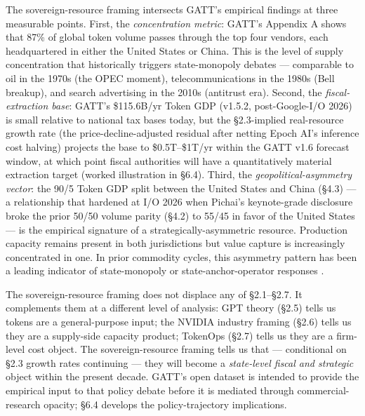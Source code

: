 \documentclass[11pt,a4paper]{article}
\begin{document}
The sovereign-resource framing intersects GATT's empirical findings at three measurable points. First, the \emph{concentration metric}: GATT's Appendix A shows that 87\% of global token volume passes through the top four vendors, each headquartered in either the United States or China. This is the level of supply concentration that historically triggers state-monopoly debates --- comparable to oil in the 1970s (the OPEC moment), telecommunications in the 1980s (Bell breakup), and search advertising in the 2010s (antitrust era). Second, the \emph{fiscal-extraction base}: GATT's \$115.6B/yr Token GDP (v1.5.2, post-Google-I/O 2026) is small relative to national tax bases today, but the §2.3-implied real-resource growth rate (the price-decline-adjusted residual after netting Epoch AI's \cite{epoch2026inference} inference cost halving) projects the base to \$0.5T–\$1T/yr within the GATT v1.6 forecast window, at which point fiscal authorities will have a quantitatively material extraction target (worked illustration in §6.4). Third, the \emph{geopolitical-asymmetry vector}: the 90/5 Token GDP split between the United States and China (§4.3) --- a relationship that hardened at I/O 2026 when Pichai's keynote-grade disclosure \cite{pichai2026io} broke the prior 50/50 volume parity (§4.2) to 55/45 in favor of the United States --- is the empirical signature of a strategically-asymmetric resource. Production capacity remains present in both jurisdictions but value capture is increasingly concentrated in one. In prior commodity cycles, this asymmetry pattern has been a leading indicator of state-monopoly or state-anchor-operator responses \cite{levi1988rule}.

The sovereign-resource framing does not displace any of §2.1–§2.7. It complements them at a different level of analysis: GPT theory (§2.5) tells us tokens are a general-purpose input; the NVIDIA industry framing (§2.6) tells us they are a supply-side capacity product; TokenOps (§2.7) tells us they are a firm-level cost object. The sovereign-resource framing tells us that --- conditional on §2.3 growth rates continuing --- they will become a \emph{state-level fiscal and strategic} object within the present decade. GATT's open dataset is intended to provide the empirical input to that policy debate before it is mediated through commercial-research opacity; §6.4 develops the policy-trajectory implications.
\end{document}
